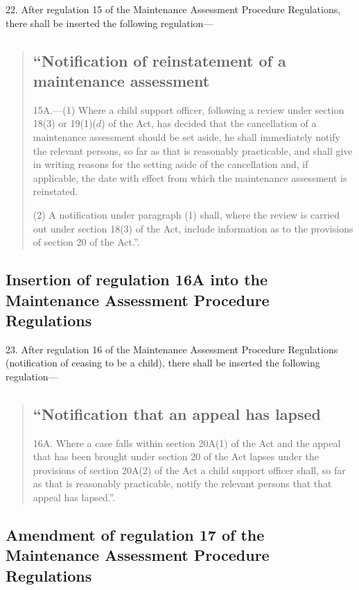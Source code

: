 \documentclass[12pt,a4paper]{article}
\begin{document}
22.  After regulation 15 of the Maintenance Assessment Procedure Regulations, there shall be inserted the following regulation—
\begin{quotation}
\subsection*{“Notification of reinstatement of a maintenance assessment}

15A.—(1) Where a child support officer, following a review under section 18(3) or 19(1)($d$) of the Act, has decided that the cancellation of a maintenance assessment should be set aside, he shall immediately notify the relevant persons, so far as that is reasonably practicable, and shall give in writing reasons for the setting aside of the cancellation and, if applicable, the date with effect from which the maintenance assessment is reinstated.

(2) A notification under paragraph (1) shall, where the review is carried out under section 18(3) of the Act, include information as to the provisions of section 20 of the Act.”.
\end{quotation}

\subsection[23. Insertion of regulation 16A into the Maintenance Assessment Procedure Regulations]{Insertion of regulation 16A into the Maintenance Assessment Procedure Regulations}

23.  After regulation 16 of the Maintenance Assessment Procedure Regulations (notification of ceasing to be a child), there shall be inserted the following regulation—
\begin{quotation}
\subsection*{“Notification that an appeal has lapsed}

16A.  Where a case falls within section 20A(1) of the Act and the appeal that has been brought under section 20 of the Act lapses under the provisions of section 20A(2) of the Act a child support officer shall, so far as that is reasonably practicable, notify the relevant persons that that appeal has lapsed.”.
\end{quotation}

\subsection[24. Amendment of regulation 17 of the Maintenance Assessment Procedure Regulations]{Amendment of regulation 17 of the Maintenance Assessment Procedure Regulations}
\end{document}
